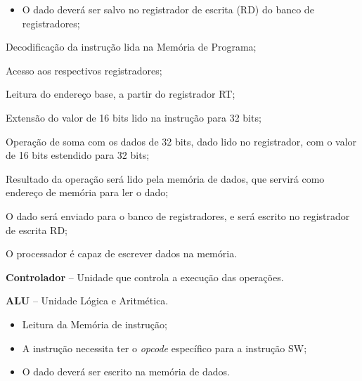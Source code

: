\documentclass{article}
\begin{document}
  \postconditions
    \begin{itemize}
     \item O dado deverá ser salvo no registrador de escrita (RD) do banco de registradores;
    \end{itemize}
  
  
  \begin{mainflow}
    \item Decodificação da instrução lida na Memória de Programa;
    \item Acesso aos respectivos registradores;
    \item Leitura do endereço base, a partir do registrador RT;
    \item Extensão do valor de 16 bits lido na instrução para 32 bits;
    \item Operação de soma com os dados de 32 bits, dado lido no registrador, com o valor de 16 bits estendido para 32 bits;
    \item Resultado da operação será lido pela memória de dados, que servirá como endereço de memória para ler o dado;
    \item O dado será enviado para o banco de registradores, e será escrito no registrador de escrita RD;

  \end{mainflow}
  
  O processador é capaz de escrever dados na memória.
  \actors
    \begin{description}
     \item \textbf{Controlador} – Unidade que controla a execução das operações.
     \item \textbf{ALU} – Unidade L\'{o}gica e Aritm\'{e}tica.
    \end{description}
    
  \preconditions 
    \begin{itemize}
     \item Leitura da Memória de instrução;
     \item A instrução necessita ter o \textit{opcode} específico para a instrução SW;
    \end{itemize}

  \postconditions
    \begin{itemize}
     \item O dado deverá ser escrito na memória de dados.
    \end{itemize}
  
\end{document}
